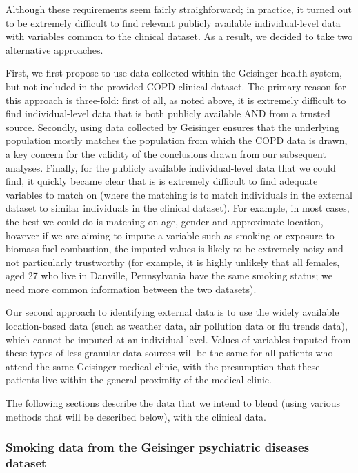 \documentclass{article}
\begin{document}
Although these requirements seem fairly straighforward; in practice, it turned out to be extremely difficult to find relevant publicly available individual-level data with variables common to the clinical dataset. As a result, we decided to take two alternative approaches. 

First, we first propose to use data collected within the Geisinger health system, but not included in the provided COPD clinical dataset. The primary reason for this approach is three-fold: first of all, as noted above, it is extremely difficult to find individual-level data that is both publicly available AND from a trusted source. Secondly, using data collected by Geisinger ensures that the underlying population mostly matches the population from which the COPD data is drawn, a key concern for the validity of the conclusions drawn from our subsequent analyses. Finally, for the publicly available individual-level data that we could find, it quickly became clear that is is extremely difficult to find adequate variables to match on (where the matching is to match individuals in the external dataset to similar individuals in the clinical dataset). For example, in most cases, the best we could do is matching on age, gender and approximate location, however if we are aiming to impute a variable such as smoking or exposure to biomass fuel combustion, the imputed values is likely to be extremely noisy and not particularly trustworthy (for example, it is highly unlikely that all females, aged 27 who live in Danville, Pennsylvania have the same smoking status; we need more common information between the two datasets).

Our second approach to identifying external data is to use the widely available location-based data (such as weather data, air pollution data or flu trends data), which cannot be imputed at an individual-level. Values of variables imputed from these types of less-granular data sources will be the same for all patients who attend the same Geisinger medical clinic, with the presumption that these patients live within the general proximity of the medical clinic.

The following sections describe the data that we intend to blend (using various methods that will be described below), with the clinical data.

\subsubsection{Smoking data from the Geisinger psychiatric diseases dataset}
\end{document}
